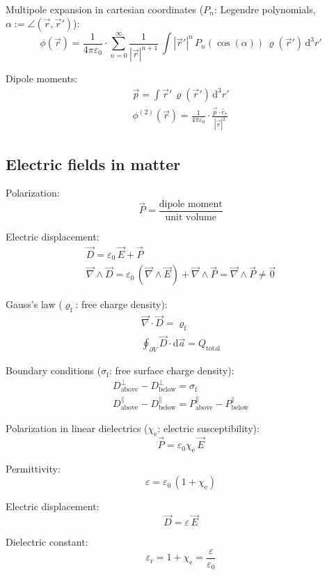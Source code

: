 \documentclass[fontsize=11pt,a4paper]{scrartcl}
\begin{document}
Multipole expansion in cartesian coordinates ($P_n$: Legendre polynomials, $\alpha:=\angle\left(\vec r,\vec r'\right)$):
\[
	\phi(\vec r)=\frac{1}{4\pi\varepsilon_0}\cdot\sum_{n=0}^\infty\frac{1}{|\vec r|^{n+1}}\,\int|\vec r'|^n\,P_n\left(\cos(\alpha)\right)\,\varrho(\vec r')\,\mathrm{d}^3 r'
\]

Dipole moments:
\begin{gather*}
	\vec p=\int\vec r'\,\varrho(\vec r')\,\mathrm{d}^3 r'\\
	\phi^{(2)}(\vec r)=\frac{1}{4\pi\varepsilon_0}\cdot\frac{\vec p\cdot\hat e_r}{|\vec r|^2}
\end{gather*}
%
%
%
%
\subsection{Electric fields in matter}
Polarization:
\[
	\vec P=\frac{\text{dipole moment}}{\text{unit volume}}
\]

Electric displacement:
\begin{gather*}
	\vec D=\varepsilon_0\,\vec E+\vec P\\
	\vec\nabla\wedge\vec D=\varepsilon_0\,(\vec\nabla\wedge\vec E)+\vec\nabla\wedge\vec P=
		\vec\nabla\wedge\vec P\neq\vec 0
\end{gather*}

Gauss's law ($\varrho_\mathrm{f}$: free charge density):
\begin{gather*}
	\vec\nabla\cdot\vec D = \varrho_\mathrm{f}\\
	\oint_{\partial V}\vec D\cdot\mathrm{d}\vec a = Q_\mathrm{total}
\end{gather*}

Boundary conditions ($\sigma_\mathrm{f}$: free surface charge density):
\begin{gather*}
	D_\text{above}^\perp -D_\text{below}^\perp = \sigma_\mathrm{f}\\
	D_\text{above}^\parallel - D_\text{below}^\parallel = P_\text{above}^\parallel - P_\text{below}^\parallel
\end{gather*}

Polarization in linear dielectrics ($\chi_\mathrm{e}$: electric susceptibility):
\[
	\vec P=\varepsilon_0\chi_\mathrm{e}\,\vec E
\]

Permittivity:
\[
	\varepsilon=\varepsilon_0\,(1+\chi_\mathrm{e})
\]

Electric displacement:
\[
	\vec D=\varepsilon\,\vec E
\]

Dielectric constant:
\[
	\varepsilon_\mathrm{r} = 1+\chi_\mathrm{e}=\frac{\varepsilon}{\varepsilon_0}
\]
%
%
%
%
\end{document}
